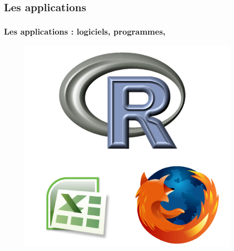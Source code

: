\documentclass[table,svgnames,hyperref={pdfpagemode=FullScreen}]{beamer}
\begin{document}
\subsection{Les applications}
\begin{frame}
	\frametitle{Les applications : logiciels, programmes, }
	\begin{figure}[h]
		\begin{center}
		  \includegraphics[scale=0.45]{image/software.png}
		\end{center}
	\end{figure}
\end{frame}
\end{document}
